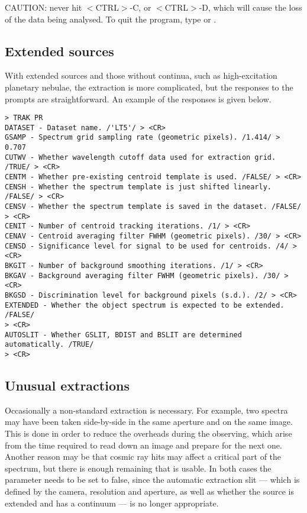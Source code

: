 CAUTION: never hit $<$CTRL$>$-C, or $<$CTRL$>$-D, which will cause the loss of
the data being analysed.
To quit the program, type  or
\@.

\subsection{Extended sources}

With extended sources and those without continua, such as high-excitation
planetary nebulae, the extraction is more complicated, but the responses
to the prompts are straightforward. An example of the responses is given below.

\begin{verbatim}
> TRAK PR
DATASET - Dataset name. /'LT5'/ > <CR>
GSAMP - Spectrum grid sampling rate (geometric pixels). /1.414/ > 0.707
CUTWV - Whether wavelength cutoff data used for extraction grid. /TRUE/ > <CR>
CENTM - Whether pre-existing centroid template is used. /FALSE/ > <CR>
CENSH - Whether the spectrum template is just shifted linearly. /FALSE/ > <CR>
CENSV - Whether the spectrum template is saved in the dataset. /FALSE/ > <CR>
CENIT - Number of centroid tracking iterations. /1/ > <CR>
CENAV - Centroid averaging filter FWHM (geometric pixels). /30/ > <CR>
CENSD - Significance level for signal to be used for centroids. /4/ >  <CR>
BKGIT - Number of background smoothing iterations. /1/ > <CR>
BKGAV - Background averaging filter FWHM (geometric pixels). /30/ > <CR>
BKGSD - Discrimination level for background pixels (s.d.). /2/ > <CR>
EXTENDED - Whether the object spectrum is expected to be extended. /FALSE/
> <CR>
AUTOSLIT - Whether GSLIT, BDIST and BSLIT are determined automatically. /TRUE/
> <CR>
\end{verbatim}

\subsection{Unusual extractions}

Occasionally a non-standard extraction is necessary.  For example, two spectra
may have been taken side-by-side in the same aperture and on the same image.
This is done in order to reduce the overheads during the observing, which arise
from the time required to read down an image and prepare for the next one.
Another reason may be that cosmic ray hits may affect a critical part of the
spectrum, but there is enough remaining that is usable.  In both cases the
 parameter needs to be set to false,
since the automatic
extraction slit --- which is defined by the camera, resolution and aperture,
as well as whether the source is extended and has a continuum --- is no longer
appropriate.

